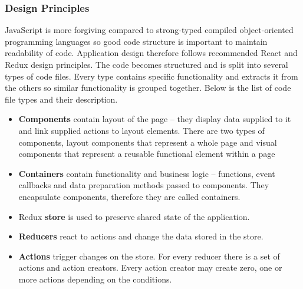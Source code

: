 \subsubsection{Design Principles}

JavaScript is more forgiving compared to strong-typed compiled object-oriented programming languages so good code structure is important to maintain readability of code. Application design therefore follows recommended React and Redux design principles. The code becomes structured and is split into several types of code files. Every type contains specific functionality and extracts it from the others so similar functionality is grouped together. Below is the list of code file types and their description.

\begin{itemize}
    \item \textbf{Components} contain layout of the page – they display data supplied to it and link supplied actions to layout elements. There are two types of components, layout components that represent a whole page and visual components that represent a reusable functional element within a page
    \item \textbf{Containers} contain functionality and business logic – functions, event callbacks and data preparation methods passed to components. They encapsulate components, therefore they are called containers. 
    \item Redux \textbf{store} is used to preserve shared state of the application.
    \item \textbf{Reducers} react to actions and change the data stored in the store.
    \item \textbf{Actions} trigger changes on the store. For every reducer there is a set of actions and action creators. Every action creator may create zero, one or more actions depending on the conditions.
\end{itemize}

